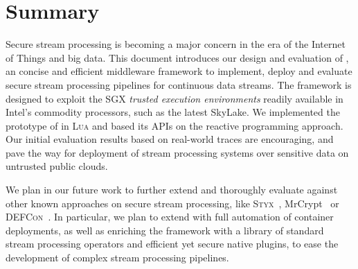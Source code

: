 
\chapter{Summary}
\label{chap:summ}

Secure stream processing is becoming a major concern in the era of the Internet of Things and big data.
This document introduces our design and evaluation of \SS{}, an concise and efficient middleware framework to implement, deploy and evaluate secure stream processing pipelines for continuous data streams.
The framework is designed to exploit the SGX \emph{trusted execution environments} readily available in Intel{\textregistered}'s commodity processors, such as the latest SkyLake.
We implemented the prototype of \SS{} in \textsc{Lua} and based its APIs on the reactive programming approach.
Our initial evaluation results based on real-world traces are encouraging, and pave the way for deployment of stream processing systems over sensitive data on untrusted public clouds.

We plan in our future work to further extend and thoroughly evaluate \SS against other known approaches on secure stream processing, like \textsc{Styx}~\cite{Stephen:2016:SSP:2987550.2987574}, MrCrypt~\cite{tetali2013mrcrypt} or \textsc{DEFCon}~\cite{Migliavacca:2010:DHE}.
In particular, we plan to extend \SS with full automation of container deployments, as well as enriching the framework with a library of standard stream processing operators and efficient yet secure native plugins, to ease the development of complex stream processing pipelines.
